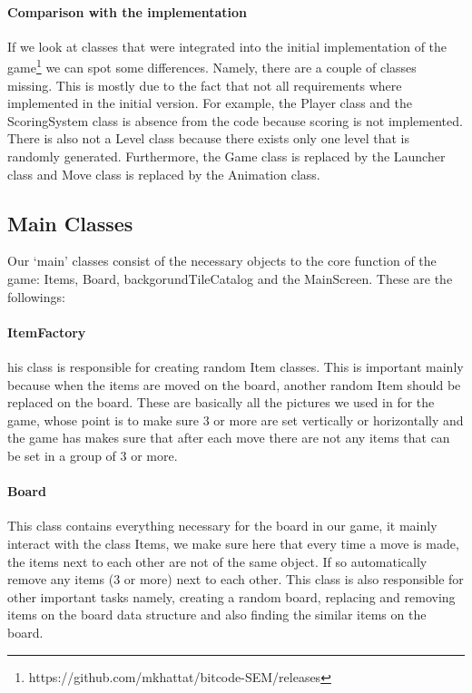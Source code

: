 \documentclass{article}
\begin{document}


\paragraph{Comparison with the implementation} If we look at classes that were integrated into the initial implementation of the game\footnote{https://github.com/mkhattat/bitcode-SEM/releases} we can spot some differences. Namely, there are a couple of classes missing. This is mostly due to the fact that not all requirements where implemented in the initial version. For example, the Player class and the ScoringSystem class is absence from the code because scoring is not implemented. There is also not a Level class because there exists only one level that is randomly generated. Furthermore, the Game class is replaced by the Launcher class and Move class is replaced by the Animation class.


\subsection{Main Classes}
Our ‘main’ classes consist of the necessary objects to the core function of the game:
Items, Board, backgorundTileCatalog and the MainScreen. These are the followings:

\paragraph{ItemFactory} his class is responsible for creating random Item classes. This is important mainly because when the items are moved on the board, another random Item should be replaced on the board. These are basically all the pictures we used in for the game, whose point is to make sure 3 or more are set vertically or horizontally and the game has makes sure that after each move there are not any items that can be set in a group of 3 or more.

\paragraph{Board} This class contains everything necessary for the board in our game, it mainly interact with the class Items,  we make sure here that every time a move is made, the items next to each other are not of the same object. If so automatically remove any items (3 or more) next to each other. This class is also responsible for other important tasks namely, creating a random board, replacing and removing items on the board data structure and also finding the similar items on the board.
\end{document}
